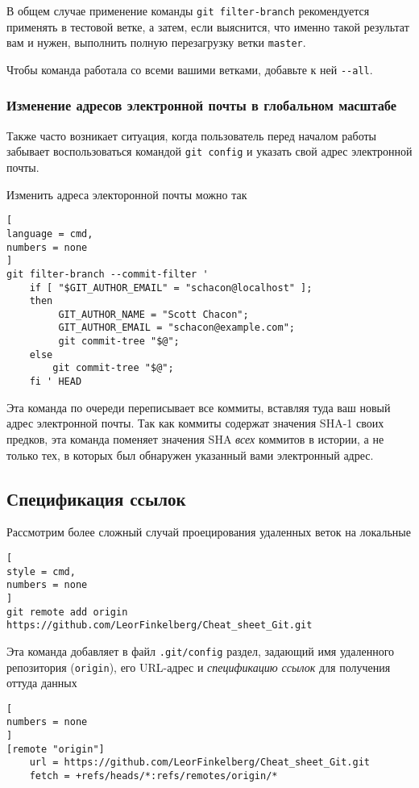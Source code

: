 \documentclass[%
	11pt,
	a4paper,
	utf8,
		]{article}
\begin{document}
В общем случае применение команды \lstinline{git filter-branch} рекомендуется применять в тестовой ветке, а затем, если выяснится, что именно такой результат вам и нужен, выполнить полную перезагрузку ветки \texttt{master}.

Чтобы команда работала со всеми вашими ветками, добавьте к ней \lstinline{--all}.

\subsubsection{Изменение адресов электронной почты в глобальном масштабе}

Также часто возникает ситуация, когда пользователь перед началом работы забывает воспользоваться командой \lstinline{git config} и указать свой адрес электронной почты.

Изменить адреса электоронной почты можно так

\begin{lstlisting}[
language = cmd,
numbers = none
]
git filter-branch --commit-filter '
    if [ "$GIT_AUTHOR_EMAIL" = "schacon@localhost" ];
    then
         GIT_AUTHOR_NAME = "Scott Chacon";
         GIT_AUTHOR_EMAIL = "schacon@example.com";
         git commit-tree "$@";
    else
        git commit-tree "$@";
    fi ' HEAD
\end{lstlisting}

Эта команда по очереди переписывает все коммиты, вставляя туда ваш новый адрес электронной почты. Так как коммиты содержат значения SHA-1 своих предков, эта команда поменяет значения SHA \emph{всех} коммитов в истории, а не только тех, в которых был обнаружен указанный вами электронный адрес.

\subsection{Спецификация ссылок}

Рассмотрим более сложный случай проецирования удаленных веток на локальные
\begin{lstlisting}[
style = cmd,
numbers = none
]
git remote add origin https://github.com/LeorFinkelberg/Cheat_sheet_Git.git
\end{lstlisting}

Эта команда добавляет в файл \verb|.git/config| раздел, задающий имя удаленного репозитория (\texttt{origin}), его URL-адрес и \emph{спецификацию ссылок} для получения оттуда данных
\begin{lstlisting}[
numbers = none
]
[remote "origin"]
    url = https://github.com/LeorFinkelberg/Cheat_sheet_Git.git
    fetch = +refs/heads/*:refs/remotes/origin/*
\end{lstlisting}
\end{document}

